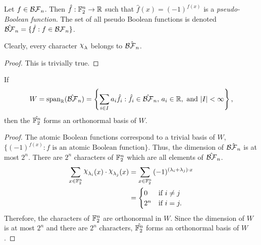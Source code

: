 \begin{definition}\label{def:pBF}
  Let $f\in\mathcal{BF}_n$. Then $\hat{f}:\mathbb{F}_2^n\rightarrow\mathbb{R}$ such that
  $\hat{f}(x)=(-1)^{f(x)}$ is a \textit{pseudo-Boolean function}. The set of all
  pseudo Boolean functions is denoted $\hat{\mathcal{BF}}_n=\{\hat{f}:f\in\mathcal{BF}_n\}$.
\end{definition}
\begin{lemma}
\par Clearly, every character $\Chi_\lambda$ belongs to $\hat{\mathcal{BF}_n}$.
\end{lemma}
\begin{proof}
  \par This is trivially true.
\end{proof}
\begin{lemma}
  If \[W={\rm span}_\rrr(\hat{\BF}_n)=\left\{\sum_{i\in I}a_i\hat{f}_i:
  \hat{f}_i\in\hat{\BF}_n{\rm ,\ }a_i\in\rrr{\rm ,\ and\ }|I|<\infty\right\},\]
  then the $\hat{\mathbb{F}_2^n}$ forms an orthonormal basis of $W$.
\end{lemma}
\begin{proof}
  The atomic Boolean functions correspond to a trivial basis of $W$,
  $\{(-1)^{f(x)}:f \text{ is an atomic Boolean function}\}$. Thus, the dimension
  of $\hat{\mathcal{BF}_n}$ is at most $2^n$. There are $2^n$ characters of $\mathbb{F}_2^n$
  which are all elements of $\hat{\mathcal{BF}}_n$.
  \begin{align*}
    \sum_{x\in\gftwo^n}{\Chi_{\lambda_i}(x)\cdot\Chi_{\lambda_j}(x)}
    &=\sum_{x\in\gftwo^n}
      {(-1)^{(\lambda_i+\lambda_j)\cdot x}}\\
    &=\begin{cases}
      0 & \text{if } i\not=j \\
      2^n & \text{if } i=j.
    \end{cases}
  \end{align*}
  Therefore, the characters of $\mathbb{F}_2^n$ are orthonormal in $W$. Since the
  dimension of $W$ is at most $2^n$ and there are $2^n$ characters,
  $\hat{\mathbb{F}_2^n}$ forms an orthonormal basis of $W$.
\end{proof}



